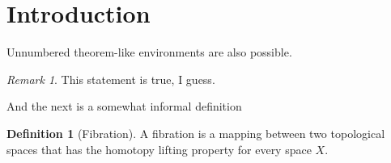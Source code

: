 \documentclass{article}
\theoremstyle{definition}
\newtheorem{definition}{Definition}[section]
\theoremstyle{remark}
\newtheorem*{remark}{Remark}
\begin{document}
\section{Introduction}
Unnumbered theorem-like environments are also possible.

\begin{remark}
This statement is true, I guess.
\end{remark}

And the next is a somewhat informal definition

\begin{definition}[Fibration]
A fibration is a mapping between two topological spaces that has the homotopy lifting property for every space \(X\).
\end{definition}
\end{document}
